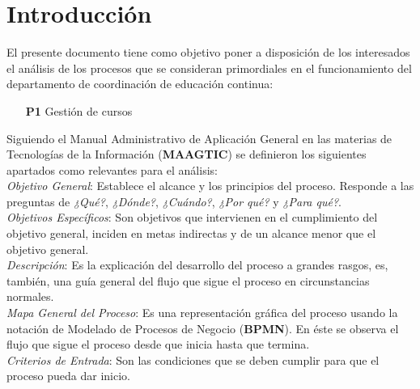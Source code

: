 \newpage
\section{Introducción}

    

   	
\begin{footnotesize}	
	El presente documento tiene como objetivo poner a disposición de los interesados el análisis de los procesos que se consideran primordiales en el funcionamiento del departamento de coordinación de educación continua:\\

\begin{itemize}
	\item[\textbf{P1}] Gestión de cursos
\end{itemize}

Siguiendo el Manual Administrativo de Aplicación General en las materias de Tecnologías de la Información (\textbf{MAAGTIC}) se definieron los siguientes apartados como relevantes para el análisis:\\

\textit{Objetivo General}: Establece el alcance y los principios del proceso. Responde a las preguntas de \textit{¿Qué?}, \textit{¿Dónde?}, \textit{¿Cuándo?}, \textit{¿Por qué?} y \textit{¿Para qué?}.\\

\textit{Objetivos Específicos}: Son objetivos que intervienen en el cumplimiento del objetivo general, inciden en metas indirectas y de un alcance menor que el objetivo general.\\

\textit{Descripción}: Es la explicación del desarrollo del proceso a grandes rasgos, es, también, una guía general del flujo que sigue el proceso en circunstancias normales.\\

\textit{Mapa General del Proceso}: Es una representación gráfica del proceso usando la notación de Modelado de Procesos de Negocio (\textbf{BPMN}). En éste se observa el flujo que sigue el proceso desde que inicia hasta que termina.\\

\textit{Criterios de Entrada}: Son las condiciones que se deben cumplir para que el proceso pueda dar inicio.\\


\end{footnotesize}
